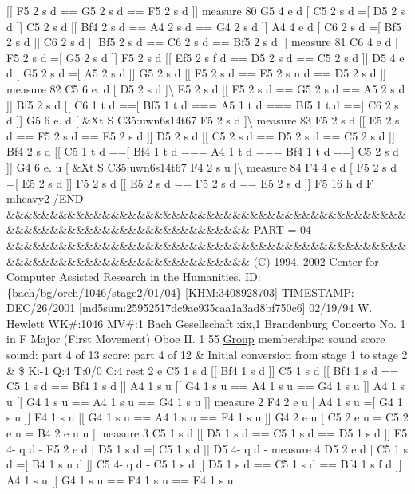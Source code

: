 \mbox{[}\mbox{[} F5 2 s d == G5 2 s d == F5 2 s d \mbox{]}\mbox{]} measure 80 G5 4 e d \mbox{[} C5 2 s d =\mbox{[} D5 2 s d \mbox{]}\mbox{]} C5 2 s d \mbox{[}\mbox{[} Bf4 2 s d == A4 2 s d == G4 2 s d \mbox{]}\mbox{]} A4 4 e d \mbox{[} C6 2 s d =\mbox{[} Bf5 2 s d \mbox{]}\mbox{]} C6 2 s d \mbox{[}\mbox{[} Bf5 2 s d == C6 2 s d == Bf5 2 s d \mbox{]}\mbox{]} measure 81 C6 4 e d \mbox{[} F5 2 s d =\mbox{[} G5 2 s d \mbox{]}\mbox{]} F5 2 s d \mbox{[}\mbox{[} Ef5 2 s f d == D5 2 s d == C5 2 s d \mbox{]}\mbox{]} D5 4 e d \mbox{[} G5 2 s d =\mbox{[} A5 2 s d \mbox{]}\mbox{]} G5 2 s d \mbox{[}\mbox{[} F5 2 s d == E5 2 s n d == D5 2 s d \mbox{]}\mbox{]} measure 82 C5 6 e. d \mbox{[} D5 2 s d \mbox{]}\textbackslash{} E5 2 s d \mbox{[}\mbox{[} F5 2 s d == G5 2 s d == A5 2 s d \mbox{]}\mbox{]} Bf5 2 s d \mbox{[}\mbox{[} C6 1 t d ==\mbox{[} Bf5 1 t d === A5 1 t d === Bf5 1 t d ==\mbox{]} C6 2 s d \mbox{]}\mbox{]} G5 6 e. d \mbox{[} \&Xt S C35\+:uwn6s14t67 F5 2 s d \mbox{]}\textbackslash{} measure 83 F5 2 s d \mbox{[}\mbox{[} E5 2 s d == F5 2 s d == E5 2 s d \mbox{]}\mbox{]} D5 2 s d \mbox{[}\mbox{[} C5 2 s d == D5 2 s d == C5 2 s d \mbox{]}\mbox{]} Bf4 2 s d \mbox{[}\mbox{[} C5 1 t d ==\mbox{[} Bf4 1 t d === A4 1 t d === Bf4 1 t d ==\mbox{]} C5 2 s d \mbox{]}\mbox{]} G4 6 e. u \mbox{[} \&Xt S C35\+:uwn6s14t67 F4 2 s u \mbox{]}\textbackslash{} measure 84 F4 4 e d \mbox{[} F5 2 s d =\mbox{[} E5 2 s d \mbox{]}\mbox{]} F5 2 s d \mbox{[}\mbox{[} E5 2 s d == F5 2 s d == E5 2 s d \mbox{]}\mbox{]} F5 16 h d F mheavy2 /\+E\+ND \&\&\&\&\&\&\&\&\&\&\&\&\&\&\&\&\&\&\&\&\&\&\&\&\&\&\&\&\&\&\&\&\&\&\&\&\&\&\&\&\&\&\&\&\&\&\&\&\&\&\&\&\&\&\&\&\&\&\&\&\&\&\&\&\&\&\&\&\&\&\&\&\&\& P\+A\+RT = 04 \&\&\&\&\&\&\&\&\&\&\&\&\&\&\&\&\&\&\&\&\&\&\&\&\&\&\&\&\&\&\&\&\&\&\&\&\&\&\&\&\&\&\&\&\&\&\&\&\&\&\&\&\&\&\&\&\&\&\&\&\&\&\&\&\&\&\&\&\&\&\&\&\&\& (C) 1994, 2002 Center for Computer Assisted Research in the Humanities. ID\+: \{bach/bg/orch/1046/stage2/01/04\} \mbox{[}K\+HM\+:3408928703\mbox{]} T\+I\+M\+E\+S\+T\+A\+MP\+: D\+E\+C/26/2001 \mbox{[}md5sum\+:25952517dc9ae935caa1a3ad8bf750c6\mbox{]} 02/19/94 W. Hewlett WK\#\+:1046 MV\#\+:1 Bach Gesellschaft xix,1 Brandenburg Concerto No. 1 in F Major (First Movement) Oboe II. 1 55 \hyperlink{class_group}{Group} memberships\+: sound score sound\+: part 4 of 13 score\+: part 4 of 12 \& Initial conversion from stage 1 to stage 2 \& \$ K\+:-\/1 Q\+:4 T\+:0/0 C\+:4 rest 2 e C5 1 s d \mbox{[}\mbox{[} Bf4 1 s d \mbox{]}\mbox{]} C5 1 s d \mbox{[}\mbox{[} Bf4 1 s d == C5 1 s d == Bf4 1 s d \mbox{]}\mbox{]} A4 1 s u \mbox{[}\mbox{[} G4 1 s u == A4 1 s u == G4 1 s u \mbox{]}\mbox{]} A4 1 s u \mbox{[}\mbox{[} G4 1 s u == A4 1 s u == G4 1 s u \mbox{]}\mbox{]} measure 2 F4 2 e u \mbox{[} A4 1 s u =\mbox{[} G4 1 s u \mbox{]}\mbox{]} F4 1 s u \mbox{[}\mbox{[} G4 1 s u == A4 1 s u == F4 1 s u \mbox{]}\mbox{]} G4 2 e u \mbox{[} C5 2 e u = C5 2 e u = B4 2 e n u \mbox{]} measure 3 C5 1 s d \mbox{[}\mbox{[} D5 1 s d == C5 1 s d == D5 1 s d \mbox{]}\mbox{]} E5 4-\/ q d -\/ E5 2 e d \mbox{[} D5 1 s d =\mbox{[} C5 1 s d \mbox{]}\mbox{]} D5 4-\/ q d -\/ measure 4 D5 2 e d \mbox{[} C5 1 s d =\mbox{[} B4 1 s n d \mbox{]}\mbox{]} C5 4-\/ q d -\/ C5 1 s d \mbox{[}\mbox{[} D5 1 s d == C5 1 s d == Bf4 1 s f d \mbox{]}\mbox{]} A4 1 s u \mbox{[}\mbox{[} G4 1 s u == F4 1 s u == E4 1 s u 